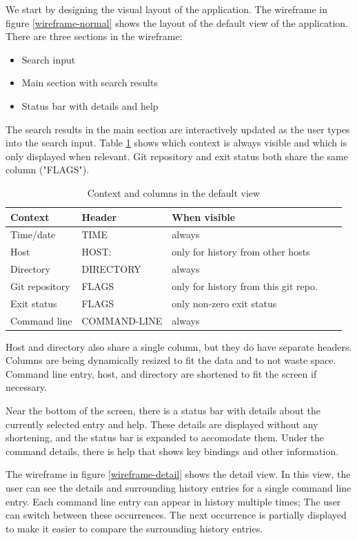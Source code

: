 We start by designing the visual layout of the application.
The wireframe in figure \ref{wireframe-normal} shows the layout of the default view of the application. There are three sections in the wireframe:

\begin{itemize}
\item Search input
\item Main section with search results
\item Status bar with details and help
\end{itemize}




The search results in the main section are interactively updated as the user types into the search input. Table \ref{tab:design-columns} shows which context is always visible and which is only displayed when relevant. Git repository and exit status both share the same column ("FLAGS"). 

\begin{table}[h]
\centering
\begin{tabular}{lllll}
\hline \hline
Context & Header & When visible \\\hline
Time/date & TIME & always \\ 
Host & HOST: & only for history from other hosts \\ 
Directory & DIRECTORY & always \\ 
Git repository & FLAGS & only for history from this git repo. \\ 
Exit status & FLAGS & only non-zero exit status \\ 
Command line & COMMAND-LINE & always \\\hline \hline
\end{tabular}
\caption{Context and columns in the default view}
\label{tab:design-columns}
\end{table}

Host and directory also share a single column, but they do have separate headers. Columns are being dynamically resized to fit the data and to not waste space. Command line entry, host, and directory are shortened to fit the screen if necessary. 

Near the bottom of the screen, there is a status bar with details about the currently selected entry and help. These details are displayed without any shortening, and the status bar is expanded to accomodate them. Under the command details, there is help that shows key bindings and other information.


The wireframe in figure \ref{wireframe-detail} shows the detail view. In this view, the user can see the details and surrounding history entries for a single command line entry. Each command line entry can appear in history multiple times; The user can switch between these occurrences. The next occurrence is partially displayed to make it easier to compare the surrounding history entries.


